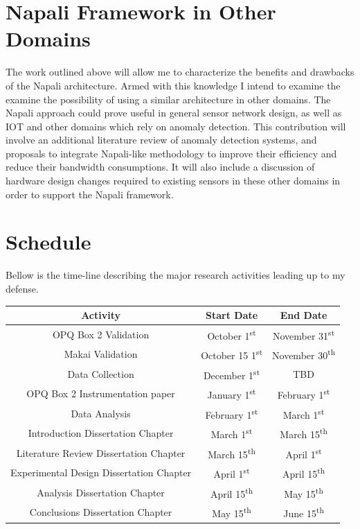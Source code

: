 \section{Napali Framework in Other Domains}
The work outlined above will allow me to characterize the benefits and drawbacks of the Napali architecture. Armed with this knowledge I intend to examine the examine the possibility of using a similar architecture in other domains. The Napali approach could prove useful in general sensor network design, as well as IOT and other domains which rely on anomaly detection. This contribution will involve an additional literature review of anomaly detection systems, and proposals to integrate Napali-like methodology to improve their efficiency and reduce their bandwidth consumptions. It will also include a discussion of hardware design changes required to existing sensors in these other domains in order to support the Napali framework.


\section{Schedule}
Bellow is the time-line describing the major research activities leading up to my defense.

\begin{center}
\begin{tabular}{ ||c | c c|| }
\hline
 \textbf{Activity} & \textbf{Start Date} & \textbf{End Date} \\ 
 \hline
 \hline
 OPQ Box 2 Validation & October 1\textsuperscript{st} & November 31\textsuperscript{st} \\  
 Makai Validation & October 15 1\textsuperscript{st} & November 30\textsuperscript{th}   \\
 Data Collection & December 1\textsuperscript{st} & TBD   \\
 OPQ Box 2 Instrumentation paper & January 1\textsuperscript{st} & February 1\textsuperscript{st}   \\
 Data Analysis & February 1\textsuperscript{st} & March 1\textsuperscript{st}  \\
 Introduction Dissertation Chapter & March 1\textsuperscript{st}  & March 15\textsuperscript{th}  \\
 Literature Review Dissertation Chapter & March 15\textsuperscript{th} & April 1\textsuperscript{st}  \\
 Experimental Design Dissertation Chapter & April 1\textsuperscript{st} & April 15\textsuperscript{th}  \\
 Analysis Dissertation Chapter & April 15\textsuperscript{th} & May 15\textsuperscript{th}  \\
 Conclusions Dissertation Chapter & May 15\textsuperscript{th} & June 15\textsuperscript{th}  \\
 \hline
 
\end{tabular}
\end{center}
